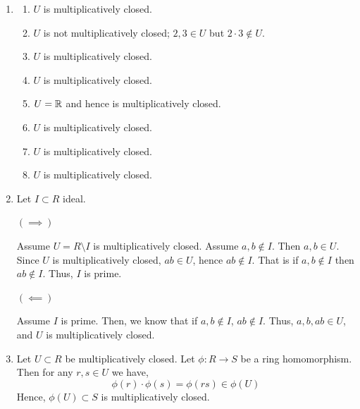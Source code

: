 \documentclass[Notebook.tex]{subfiles}
\begin{document}
\begin{solution}
	\bbni
	\begin{enumerate}
		\item \begin{enumerate}
			\item $U$ is multiplicatively closed. 
			\item $U$ is not multiplicatively closed; $2, 3 \in U$ but $2 \cdot 3 \notin U$. 
			\item $U$ is multiplicatively closed. 
			\item $U$ is multiplicatively closed. 
			\item $U = \mathbb R$ and hence is multiplicatively closed. 
			\item $U$ is multiplicatively closed. 
			\item $U$ is multiplicatively closed. 
			\item $U$ is multiplicatively closed. 
		\end{enumerate}
		\item Let $I \subset R$ ideal. 
		
		$(\implies)$ 
		
		Assume $U = R \setminus I$ is multiplicatively closed. Assume $a, b \notin I$. Then $a, b \in U$. Since $U$ is multiplicatively closed, $ab \in U$, hence $ab \notin I$. That is if $a, b\notin I$ then $ab \notin I$. Thus, $I$ is prime.  


		$(\impliedby)$ 

		Assume $I$ is prime. Then, we know that if $a, b \notin I$, $ab \notin I$. Thus, $a,b, ab \in U$, and $U$ is multiplicatively closed. 

		\item Let $U \subset R$ be multiplicatively closed. Let $\phi: R \to S$ be a ring homomorphism. Then for any $r, s \in U$ we have, 
		\[\phi(r) \cdot \phi(s) = \phi(rs) \in \phi(U)\]
		Hence, $\phi(U) \subset S$ is multiplicatively closed. 
	\end{enumerate}
\end{solution}

\newpage 
\end{document}

